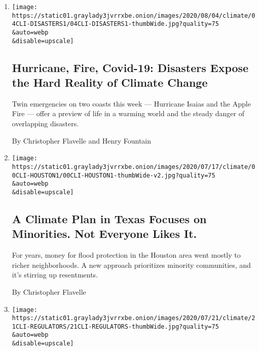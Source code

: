 \begin{enumerate}
\def\labelenumi{\arabic{enumi}.}
\item
  \href{/2020/08/04/climate/hurricane-isaias-apple-fire-climate.html}{}

  \texttt{[image: https://static01.graylady3jvrrxbe.onion/images/2020/08/04/climate/04CLI-DISASTERS1/04CLI-DISASTERS1-thumbWide.jpg?quality=75\\\&auto=webp\\\&disable=upscale]}

  \hypertarget{hurricane-fire-covid-19-disasters-expose-the-hard-reality-of-climate-change}{%
  \subsection{Hurricane, Fire, Covid-19: Disasters Expose the Hard
  Reality of Climate
  Change}\label{hurricane-fire-covid-19-disasters-expose-the-hard-reality-of-climate-change}}

  Twin emergencies on two coasts this week --- Hurricane Isaias and the
  Apple Fire --- offer a preview of life in a warming world and the
  steady danger of overlapping disasters.

  By Christopher Flavelle and Henry Fountain
\item
  \href{/2020/07/24/climate/houston-flooding-race.html}{}

  \texttt{[image: https://static01.graylady3jvrrxbe.onion/images/2020/07/17/climate/00CLI-HOUSTON1/00CLI-HOUSTON1-thumbWide-v2.jpg?quality=75\\\&auto=webp\\\&disable=upscale]}

  \hypertarget{a-climate-plan-in-texas-focuses-on-minorities-not-everyone-likes-it}{%
  \subsection{A Climate Plan in Texas Focuses on Minorities. Not
  Everyone Likes
  It.}\label{a-climate-plan-in-texas-focuses-on-minorities-not-everyone-likes-it}}

  For years, money for flood protection in the Houston area went mostly
  to richer neighborhoods. A new approach prioritizes minority
  communities, and it's stirring up resentments.

  By Christopher Flavelle
\item
  \href{/2020/07/21/climate/investors-climate-threat-regulators.html}{}

  \texttt{[image: https://static01.graylady3jvrrxbe.onion/images/2020/07/21/climate/21CLI-REGULATORS/21CLI-REGULATORS-thumbWide.jpg?quality=75\\\&auto=webp\\\&disable=upscale]}


\end{enumerate}
